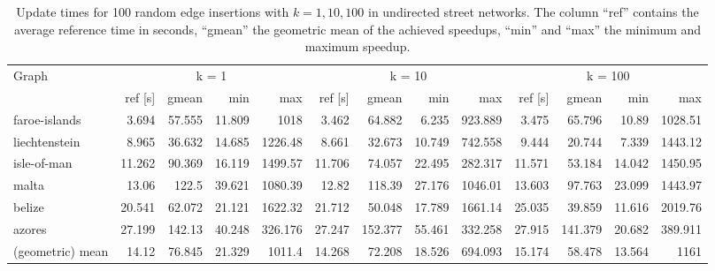 \begin{landscape}

\begin{table}[h!]
\centering
\begin{tabular}{l|rrrr|rrrr|rrrr}
\toprule
Graph & \multicolumn{4}{c|}{k = 1} & \multicolumn{4}{c|}{k = 10} & \multicolumn{4}{c}{k = 100}\\
                &     ref [s] &   gmean &   min &     max &     ref [s] &   gmean &   min &     max &     ref [s] &   gmean &   min &     max \\
\midrule \midrule
 faroe-islands    &  3.694 &  57.555 & 11.809 & 1018     &  3.462 &  64.882 &  6.235 &  923.889 &  3.475 &  65.796 & 10.89  & 1028.51  \\
 liechtenstein    &  8.965 &  36.632 & 14.685 & 1226.48  &  8.661 &  32.673 & 10.749 &  742.558 &  9.444 &  20.744 &  7.339 & 1443.12  \\
 isle-of-man      & 11.262 &  90.369 & 16.119 & 1499.57  & 11.706 &  74.057 & 22.495 &  282.317 & 11.571 &  53.184 & 14.042 & 1450.95  \\
 malta            & 13.06  & 122.5   & 39.621 & 1080.39  & 12.82  & 118.39  & 27.176 & 1046.01  & 13.603 &  97.763 & 23.099 & 1443.97  \\
 belize           & 20.541 &  62.072 & 21.121 & 1622.32  & 21.712 &  50.048 & 17.789 & 1661.14  & 25.035 &  39.859 & 11.616 & 2019.76  \\
 azores           & 27.199 & 142.13  & 40.248 &  326.176 & 27.247 & 152.377 & 55.461 &  332.258 & 27.915 & 141.379 & 20.682 &  389.911 \\ \midrule \midrule
 (geometric) mean & 14.12  &  76.845 & 21.329 & 1011.4   & 14.268 &  72.208 & 18.526 &  694.093 & 15.174 &  58.478 & 13.564 & 1161     \\
\bottomrule
\end{tabular}
\caption{Update times for 100 random edge insertions with $k = 1, 10, 100$ in undirected street networks. The column ``ref'' contains the average reference time in seconds, ``gmean'' the geometric mean of the achieved speedups, ``min'' and ``max'' the minimum and maximum speedup.}
\label{tbl:resultsStreetNetworksUndirected}
\end{table}


\end{landscape}
